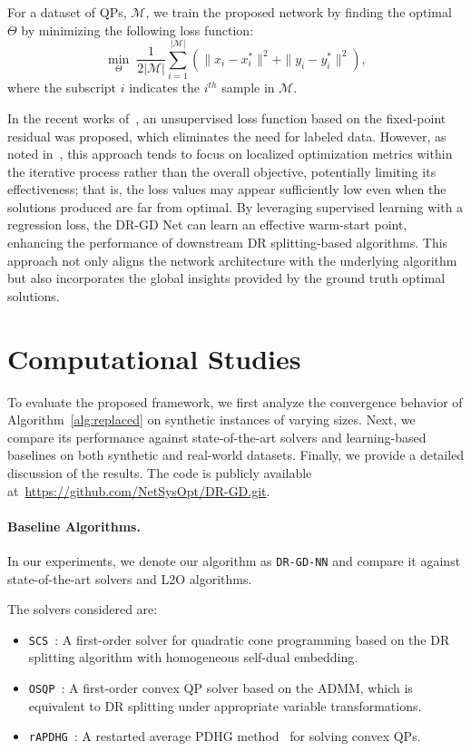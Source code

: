 \documentclass[10pt]{article} %
\begin{document}
For a dataset of QPs, $\mathcal{M}$, we train the proposed network by finding the optimal $\Theta$ by minimizing the following loss function:
\begin{equation*}
    \label{eq:loss}
    \underset{\Theta}{\min} \; \frac{1}{2|\mathcal{M}|} \sum_{i=1}^{|\mathcal{M}|} \left(\|x_i - x_i^*\|^2 + \|y_i-y_i^*\|^2\right),
\end{equation*}
where the subscript $i$ indicates the $i^{th}$ sample in $\mathcal{M}$.

In the recent works of~\citet{sambharya2023end,sambharya2024learning}, an unsupervised loss function based on the fixed-point residual was proposed, which eliminates the need for labeled data. 
However, as noted in~\citet{sambharya2024learning}, this approach tends to focus on localized optimization metrics within the iterative process rather than the overall objective, potentially limiting its effectiveness; that is, the loss values may appear sufficiently low even when the solutions produced are far from optimal. 
By leveraging supervised learning with a regression loss, the DR-GD Net can learn an effective warm-start point, enhancing the performance of downstream DR splitting-based algorithms. 
This approach not only aligns the network architecture with the underlying algorithm but also incorporates the global insights provided by the ground truth optimal solutions.

\section{Computational Studies}
To evaluate the proposed framework, we first analyze the convergence behavior of Algorithm~\ref{alg:replaced} on synthetic instances of varying sizes. 
Next, we compare its performance against state-of-the-art solvers and learning-based baselines on both synthetic and real-world datasets. 
Finally, we provide a detailed discussion of the results. 
The code is publicly available at~\url{https://github.com/NetSysOpt/DR-GD.git}.

\paragraph{Baseline Algorithms.}

In our experiments, we denote our algorithm as \texttt{DR-GD-NN} and compare it against state-of-the-art solvers and L2O algorithms. 

The solvers considered are:
\begin{itemize}
    \item[(i)] \texttt{SCS}~\citep{o2021operator}: A first-order solver for quadratic cone programming based on the DR splitting algorithm with homogeneous self-dual embedding.
    \item[(ii)] \texttt{OSQP}~\citep{stellato2020osqp}: A first-order convex QP solver based on the ADMM, which is equivalent to DR splitting under appropriate variable transformations.
    \item[(iii)] \texttt{rAPDHG}~\citep{lu2024mpax}: A restarted average PDHG method~\citep{lu2023pdqp} for solving convex QPs.
\end{itemize}
\end{document}
